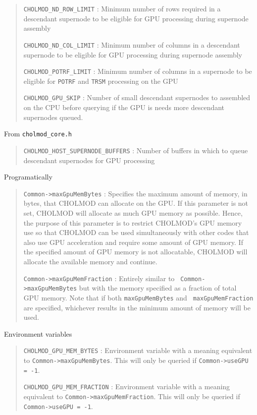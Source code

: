 \documentclass[11pt]{article}
\begin{document}
\begin{quote}
  {\tt CHOLMOD\_ND\_ROW\_LIMIT} : Minimum number of rows required in a
  descendant supernode to be eligible for GPU processing during supernode
  assembly


  {\tt CHOLMOD\_ND\_COL\_LIMIT} : Minimum number of columns in a descendant
  supernode to be eligible for GPU processing during supernode assembly


  {\tt CHOLMOD\_POTRF\_LIMIT} : Minimum number of columns in a supernode to be
  eligible for {\tt POTRF} and {\tt TRSM} processing on the GPU


  {\tt CHOLMOD\_GPU\_SKIP} : Number of small descendant supernodes to assembled
  on the CPU before querying if the GPU is needs more descendant supernodes
  queued.

\end{quote}

From {\tt cholmod\_core.h}

\begin{quote}
  {\tt CHOLMOD\_HOST\_SUPERNODE\_BUFFERS} : Number of buffers in which to queue
  descendant supernodes for GPU processing

\end{quote}

Programatically

\begin{quote}

  {\tt Common->maxGpuMemBytes} : Specifies the maximum amount of memory, in
  bytes, that CHOLMOD can allocate on the GPU.  If this parameter is not set,
  CHOLMOD will allocate as much GPU memory as possible.  Hence, the purpose of
  this parameter is to restrict CHOLMOD's GPU memory use so that CHOLMOD can be
  used simultaneously with other codes that also use GPU acceleration and
  require some amount of GPU memory.  If the specified amount of GPU memory is
  not allocatable, CHOLMOD will allocate the available memory and continue.

  {\tt Common->maxGpuMemFraction} : Entirely similar to {\tt
  Common->maxGpuMemBytes} but with the memory specified as a fraction of total
  GPU memory.  Note that if both {\tt maxGpuMemBytes} and {\tt
  maxGpuMemFraction} are specified, whichever results in the minimum amount of
  memory will be used.

\end{quote}

Environment variables

\begin{quote}
  {\tt CHOLMOD\_GPU\_MEM\_BYTES} : Environment variable with a meaning
  equivalent to \newline
  {\tt Common->maxGpuMemBytes}.  This will only be queried if
  {\tt Common->useGPU = -1}.

  {\tt CHOLMOD\_GPU\_MEM\_FRACTION} : Environment variable with a meaning
  equivalent to \newline
  {\tt Common->maxGpuMemFraction}.  This will only be queried if
  {\tt Common->useGPU = -1}.

\end{quote}
\end{document}
